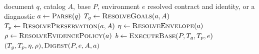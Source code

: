 \documentclass[a4paper,fleqn]{cas-sc}
\newcommand{\cl}{\operatorname{cl}}
\begin{document}
\begin{algorithm}[H]
\caption{Proposed contract compilation and preparation (C1)}\label{alg:compile}
\begin{algorithmic}[1]
\Require document $q$, catalog $A$, base $P$, environment $e$
\Ensure resolved contract and identity, or a diagnostic
\State $a\gets\Call{Parse}{q}$
\State {}
\State $T_g\gets\Call{ResolveGoals}{a,A}$
\State $T_p\gets\Call{ResolvePreservation}{a,A}$
\State {}
\State $\eta\gets\Call{ResolveEnvelope}{a}$
\State $\rho\gets\Call{ResolveEvidencePolicy}{a}$
\State {}
\State $b\gets\Call{ExecuteBase}{P,T_g,T_p,e}$
  \State \Return {}
\EndIf
\State \Return $(T_g,T_p,\eta,\rho),\Call{Digest}{P,e,A,a}$
\end{algorithmic}
\end{algorithm}






























\end{document}
